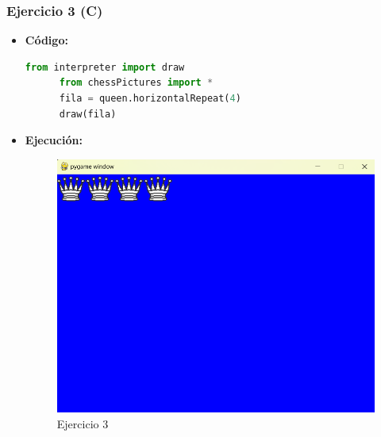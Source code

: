 \documentclass{article}
\begin{document}
  \subsubsection{Ejercicio 3 (C)}
  \begin{itemize}
    \item \textbf{Código:}
    \begin{lstlisting}[language=Python, caption=Ejercicio2c]
      from interpreter import draw
      from chessPictures import *
      fila = queen.horizontalRepeat(4)
      draw(fila)
    \end{lstlisting}
    \item \textbf{Ejecución:}  
    \begin{figure}[H]
      \centering
      \includegraphics[width=1\textwidth, keepaspectratio]{img/ejercicio2c.png}
      \caption{Ejercicio 3}
    \end{figure}
  \end{itemize}
  \newpage

\end{document}

